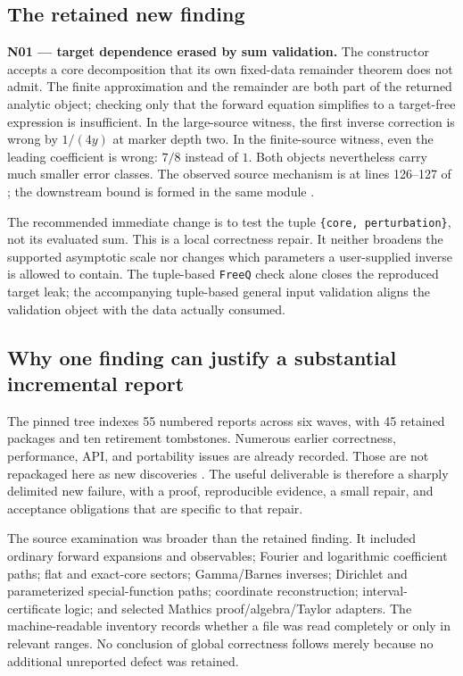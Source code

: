 \documentclass[11pt,letterpaper]{article}
\theoremstyle{remark}\newtheorem{remark}[theorem]{Remark}
\newcommand{\code}[1]{\texttt{#1}}
\newcommand{\file}[1]{\path{#1}}
\begin{document}
\subsection{The retained new finding}
\textbf{N01 --- target dependence erased by sum validation.}
The constructor accepts a core decomposition that its own fixed-data remainder
theorem does not admit. The finite approximation and the remainder are both
part of the returned analytic object; checking only that the forward equation
simplifies to a target-free expression is insufficient. In the large-source
witness, the first inverse correction is wrong by $1/(4y)$ at marker depth two.
In the finite-source witness, even the leading coefficient is wrong: $7/8$
instead of $1$. Both objects nevertheless carry much smaller error classes.
The observed source mechanism is at lines 126--127 of
\file{src/Kernel/CorePerturbation.wl}; the downstream bound is formed in the
same module \cite{core}.

The recommended immediate change is to test the tuple
\code{\{core, perturbation\}}, not its evaluated sum. This is a local
correctness repair. It neither broadens the supported asymptotic scale nor
changes which parameters a user-supplied inverse is allowed to contain.
The tuple-based \code{FreeQ} check alone closes the reproduced target leak;
the accompanying tuple-based general input validation aligns the validation
object with the data actually consumed.

\subsection{Why one finding can justify a substantial incremental report}
The pinned tree indexes 55 numbered reports across six waves, with 45 retained
packages and ten retirement tombstones. Numerous earlier correctness,
performance, API, and portability issues are already recorded. Those are not
repackaged here as new discoveries \cite{reviewindex,register,wave3,wave4,wave5,wave6}.
The useful deliverable is therefore a sharply delimited new failure, with a
proof, reproducible evidence, a small repair, and acceptance obligations that
are specific to that repair.

The source examination was broader than the retained finding. It included
ordinary forward expansions and observables; Fourier and logarithmic
coefficient paths; flat and exact-core sectors; Gamma/Barnes inverses;
Dirichlet and parameterized special-function paths; coordinate reconstruction;
interval-certificate logic; and selected Mathics proof/algebra/Taylor adapters.
The machine-readable inventory records whether a file was read completely or
only in relevant ranges. No conclusion of global correctness follows merely
because no additional unreported defect was retained.
\end{document}
